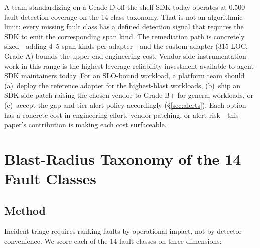 \documentclass[conference]{IEEEtran}
\begin{document}
A team standardizing on a Grade D off-the-shelf SDK today operates
at 0.500 fault-detection coverage on the 14-class taxonomy. That is
not an algorithmic limit: every missing fault class has a defined
detection signal that requires the SDK to emit the corresponding
span kind. The remediation path is concretely sized---adding 4--5
span kinds per adapter---and the custom adapter (315 LOC, Grade A)
bounds the upper-end engineering cost. Vendor-side instrumentation
work in this range is the highest-leverage reliability investment
available to agent-SDK maintainers today.
For an SLO-bound workload, a platform team should (a)~deploy the
reference adapter for the highest-blast workloads, (b)~ship an
SDK-side patch raising the chosen vendor to Grade B+ for general
workloads, or (c)~accept the gap and tier alert policy accordingly
(\S\ref{sec:alerts}). Each option has a concrete cost in engineering
effort, vendor patching, or alert risk---this paper's contribution
is making each cost surfaceable.

\section{Blast-Radius Taxonomy of the 14 Fault Classes}
\label{sec:blastradius}

\subsection{Method}

Incident triage requires ranking faults by operational impact, not by
detector convenience. We score each of the 14 fault classes on three
dimensions:
\end{document}
